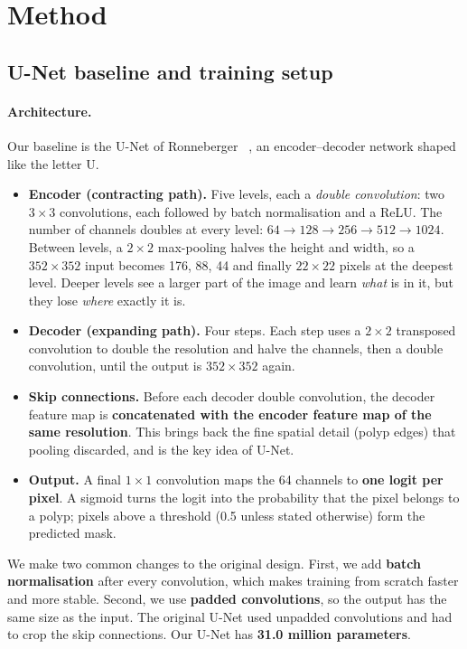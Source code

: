 \section{Method}
\label{sec:method}

\subsection{U-Net baseline and training setup}
\label{sec:unet}

\paragraph{Architecture.}
Our baseline is the U-Net of Ronneberger \etal~\cite{ronneberger2015unet}, an encoder--decoder network shaped like the letter U.
\begin{itemize}
  \item \textbf{Encoder (contracting path).} Five levels, each a \emph{double convolution}: two $3\times3$ convolutions, each
        followed by batch normalisation and a ReLU. The number of channels doubles at every level:
        $64 \rightarrow 128 \rightarrow 256 \rightarrow 512 \rightarrow 1024$. Between levels, a $2\times2$ max-pooling halves the height and width, so a
        $352\times352$ input becomes 176, 88, 44 and finally \textbf{$22\times22$} pixels at the deepest level. Deeper levels see a
        larger part of the image and learn \emph{what} is in it, but they lose \emph{where} exactly it is.
  \item \textbf{Decoder (expanding path).} Four steps. Each step uses a $2\times2$ transposed convolution to double the
        resolution and halve the channels, then a double convolution, until the output is $352\times352$ again.
  \item \textbf{Skip connections.} Before each decoder double convolution, the decoder feature map is
        \textbf{concatenated with the encoder feature map of the same resolution}. This brings back the fine spatial
        detail (polyp edges) that pooling discarded, and is the key idea of U-Net.
  \item \textbf{Output.} A final $1\times1$ convolution maps the 64 channels to \textbf{one logit per pixel}. A sigmoid turns the
        logit into the probability that the pixel belongs to a polyp; pixels above a threshold (0.5 unless stated
        otherwise) form the predicted mask.
\end{itemize}
We make two common changes to the original design. First, we add \textbf{batch normalisation} after every
convolution, which makes training from scratch faster and more stable. Second, we use \textbf{padded convolutions},
so the output has the same size as the input. The original U-Net used unpadded convolutions and had to crop
the skip connections. Our U-Net has \textbf{31.0 million parameters}.

